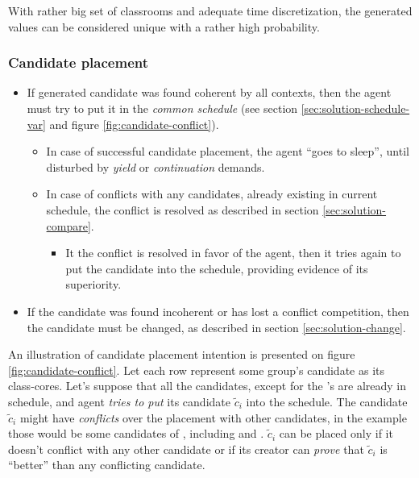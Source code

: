 \documentclass[../../ThesisDoc]{subfiles}
\begin{document}
\begin{note}
  With rather big set of classrooms and adequate time discretization, the generated
  values can be considered unique with a rather high probability.
\end{note}



\subsubsection{Candidate placement}
\begin{itemize}
  \item If generated candidate was found coherent by all contexts,
        then the agent must try to put it in the \emph{common schedule}
        (see section \ref{sec:solution-schedule-var} and figure \ref{fig:candidate-conflict}).
        \begin{itemize}
          \item In case of successful candidate placement, the agent ``goes to sleep'',
                until disturbed by \emph{yield} or \emph{continuation} demands.
          \item In case of conflicts with any candidates, already existing
                in current schedule, the conflict is resolved as described
                in section \ref{sec:solution-compare}.
                \begin{itemize}
                  \item It the conflict is resolved in favor of the agent,
                        then it tries again to put the candidate into the
                        schedule, providing evidence of its superiority.
                \end{itemize}
        \end{itemize}
  \item If the candidate was found incoherent or has lost a conflict competition,
        then the candidate must be changed, as described in section
        \ref{sec:solution-change}.
\end{itemize}

An illustration of candidate placement intention is presented on figure
\ref{fig:candidate-conflict}.
Let each row represent some group's candidate as its class-cores.
Let's suppose that all the candidates, except for the 's
are already in schedule, and agent  \emph{tries to put}
its candidate $\tilde{c}_i$ into the schedule.
The candidate $\tilde{c}_i$ might have \emph{conflicts} over the
placement with other candidates, in the example those would be
some candidates of , including  and
. $\tilde{c}_i$ can be placed only if it doesn't conflict
with any other candidate or if its creator can \emph{prove} that
$\tilde{c}_i$ is ``better'' than any conflicting candidate.
\end{document}
